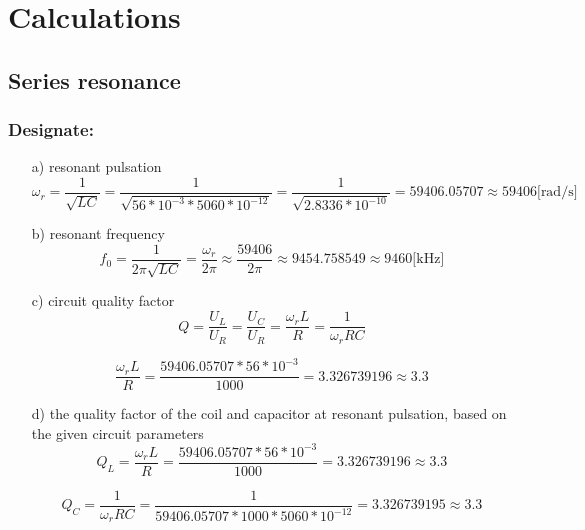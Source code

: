 \documentclass[]{scrartcl}
\begin{document}
\section{Calculations}

\subsection{Series resonance}

\subsubsection{Designate:}

\begin{itemize}
    \item[a)]resonant pulsation
    \begin{equation}
        \omega_r=\frac{1}{\sqrt{LC}}=\frac{1}{\sqrt{56*10^{-3}*5060*10^{-12}}}=\frac{1}{\sqrt{2.8336*10^{-10}}}=59406.05707\approx59406\text{[rad/s]}
    \end{equation}
\end{itemize}

\begin{itemize}
    \item[b)]resonant frequency
    \begin{equation}
        f_0=\frac{1}{2\pi\sqrt{LC}}=\frac{\omega_r}{2\pi}\approx\frac{59406}{2\pi}\approx9454.758549\approx9460\text{[kHz]}
    \end{equation}
\end{itemize}

\begin{itemize}
    \item[c)]circuit quality factor
    \begin{equation}
        Q=\frac{U_L}{U_R}=\frac{U_C}{U_R}=\frac{\omega_rL}{R}=\frac{1}{\omega_rRC}
    \end{equation}
    
    \begin{equation}
        \frac{\omega_rL}{R}=\frac{59406.05707*56*10^{-3}}{1000}=3.326739196\approx3.3
    \end{equation}
\end{itemize}

\begin{itemize}
    \item[d)]the quality factor of the coil and capacitor at resonant pulsation, based on the given circuit parameters \\
    \begin{equation}
        Q_L=\frac{\omega_rL}{R}=\frac{59406.05707*56*10^{-3}}{1000}=3.326739196\approx3.3
    \end{equation}

    \begin{equation}
        Q_C=\frac{1}{\omega_rRC}=\frac{1}{59406.05707*1000*5060*10^{-12}}=3.326739195\approx3.3
    \end{equation}
\end{itemize}
\end{document}
